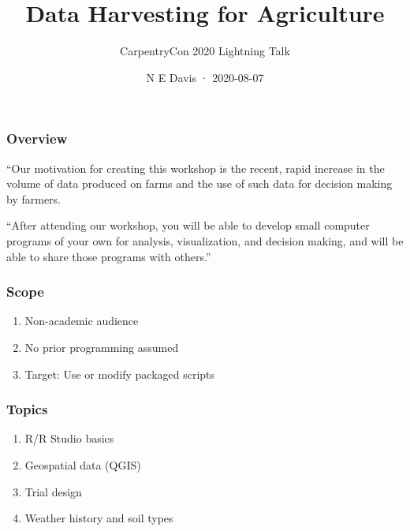 \documentclass[11pt]{beamer}
\title{Data Harvesting for Agriculture}
\author{CarpentryCon 2020 Lightning Talk}
\date{N E Davis · 2020-08-07}
\begin{document}
  \setcounter{showProgressBar}{0}
  \setcounter{showSlideNumbers}{0}

\frame{\titlepage}

\begin{frame}[fragile]
\frametitle{Overview}

  “Our motivation for creating this workshop is the recent, rapid increase in the volume of data produced on farms and the use of such data for decision making by farmers.

  “After attending our workshop, you will be able to develop small computer programs of your own for analysis, visualization, and decision making, and will be able to share those programs with others.”
\end{frame}

\begin{frame}[fragile]
\frametitle{Scope}
  \begin{enumerate}[label=\arabic*]
    \item  Non-academic audience
    \item  No prior programming assumed
    \item  Target:  Use or modify packaged scripts
  \end{enumerate}
\end{frame}

\begin{frame}[fragile]
\frametitle{Topics}
  \begin{enumerate}[label=\arabic*]
    \item  R/R Studio basics
    \item  Geospatial data (QGIS)
    \item  Trial design
    \item  Weather history and soil types
  \end{enumerate}
\end{frame}
\end{document}
